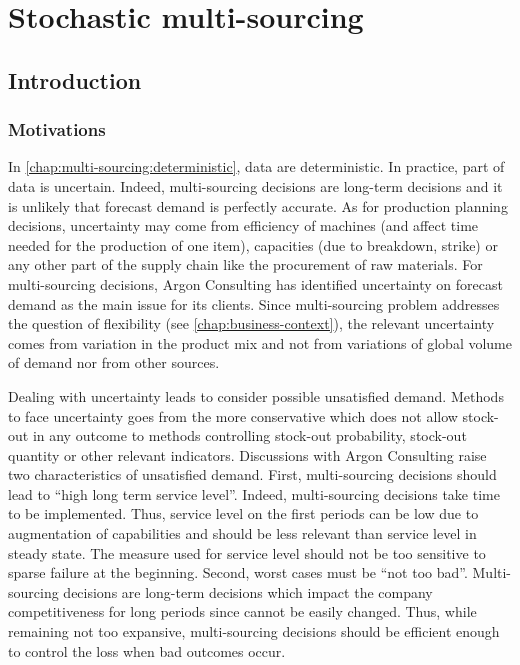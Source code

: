 \chapter{Stochastic multi-sourcing}
\label{chap:multi-sourcing:stochastic}


\section{Introduction}
\label{sec:multi-sourcing:stochastic:introduction}


\subsection{Motivations}
\label{sec:multi-sourcing:stochastic:introduction:motivations}


In \cref{chap:multi-sourcing:deterministic}, data are deterministic.
In practice, part of data is uncertain.
Indeed, multi-sourcing decisions are long-term decisions and it is unlikely that forecast demand is perfectly accurate.
As for production planning decisions, uncertainty may come from efficiency of machines (and affect time needed for the production of one item), capacities (due to breakdown, strike) or any other part of the supply chain like the procurement of raw materials.
For multi-sourcing decisions, Argon Consulting has identified uncertainty on forecast demand as the main issue for its clients.
Since multi-sourcing problem addresses the question of flexibility (see \cref{chap:business-context}), the relevant uncertainty comes from variation in the product mix and not from variations of global volume of demand nor from other sources.


Dealing with uncertainty leads to consider possible unsatisfied demand.
Methods to face uncertainty goes from the more conservative which does not allow stock-out in any outcome to methods controlling stock-out probability, stock-out quantity or other relevant indicators.
Discussions with Argon Consulting raise two characteristics of unsatisfied demand.
First, multi-sourcing decisions should lead to ``high long term service level''.
Indeed, multi-sourcing decisions take time to be implemented.
Thus, service level on the first periods can be low due to augmentation of capabilities and should be less relevant than service level in steady state.
The measure used for service level should not be too sensitive to sparse failure at the beginning.
Second, worst cases must be ``not too bad''.
Multi-sourcing decisions are long-term decisions which impact the company competitiveness for long periods since cannot be easily changed.
Thus, while remaining not too expansive, multi-sourcing decisions should be efficient enough to control the loss when bad outcomes occur.


